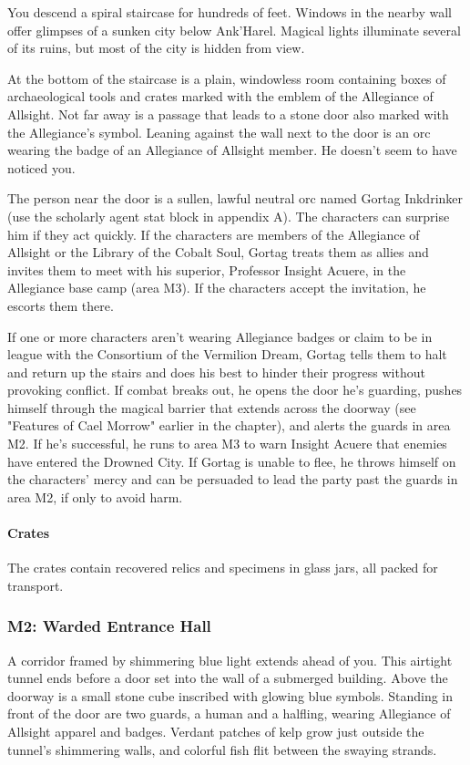 \documentclass[10pt,a4paper,twoside,twocolumn,openany,nodeprecatedcode]{dndbook}
\begin{document}
\begin{DndReadAloud}{}
You descend a spiral staircase for hundreds of feet. Windows in the nearby wall offer glimpses of a sunken city below Ank'Harel. Magical lights illuminate several of its ruins, but most of the city is hidden from view.

At the bottom of the staircase is a plain, windowless room containing boxes of archaeological tools and crates marked with the emblem of the Allegiance of Allsight. Not far away is a passage that leads to a stone door also marked with the Allegiance's symbol. Leaning against the wall next to the door is an orc wearing the badge of an Allegiance of Allsight member. He doesn't seem to have noticed you.

\end{DndReadAloud}

The person near the door is a sullen, lawful neutral orc named Gortag Inkdrinker (use the scholarly agent stat block in appendix A). The characters can surprise him if they act quickly. If the characters are members of the Allegiance of Allsight or the Library of the Cobalt Soul, Gortag treats them as allies and invites them to meet with his superior, Professor Insight Acuere, in the Allegiance base camp (area M3). If the characters accept the invitation, he escorts them there.

If one or more characters aren't wearing Allegiance badges or claim to be in league with the Consortium of the Vermilion Dream, Gortag tells them to halt and return up the stairs and does his best to hinder their progress without provoking conflict. If combat breaks out, he opens the door he's guarding, pushes himself through the magical barrier that extends across the doorway (see "Features of Cael Morrow" earlier in the chapter), and alerts the guards in area M2. If he's successful, he runs to area M3 to warn Insight Acuere that enemies have entered the Drowned City. If Gortag is unable to flee, he throws himself on the characters' mercy and can be persuaded to lead the party past the guards in area M2, if only to avoid harm.

\paragraph{Crates}
The crates contain recovered relics and specimens in glass jars, all packed for transport.

\subsubsection{M2: Warded Entrance Hall}
\begin{DndReadAloud}{}
A corridor framed by shimmering blue light extends ahead of you. This airtight tunnel ends before a door set into the wall of a submerged building. Above the doorway is a small stone cube inscribed with glowing blue symbols. Standing in front of the door are two guards, a human and a halfling, wearing Allegiance of Allsight apparel and badges. Verdant patches of kelp grow just outside the tunnel's shimmering walls, and colorful fish flit between the swaying strands.

\end{DndReadAloud}
\end{document}

